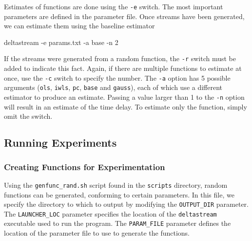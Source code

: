 \documentclass[a4paper,11pt]{article}
\begin{document}
\begin{appendices}
    Estimates of functions are done using the \texttt{-e} switch. The most
    important parameters are defined in the parameter file. Once streams have
    been generated, we can estimate them using the baseline estimator
    \begin{verbatimtab}
    deltastream -e params.txt -a base -n 2
    \end{verbatimtab}
    If the streams were generated from a random function, the \texttt{-r} switch
    must be added to indicate this fact. Again, if there are multiple functions
    to estimate at once, use the \texttt{-c} switch to specify the number. The
    \texttt{-a} option has 5 possible arguments (\texttt{ols}, \texttt{iwls},
    \texttt{pc}, \texttt{base} and \texttt{gauss}), each of which use a
    different estimator to produce an estimate. Passing a value larger than 1 to
    the \texttt{-n} option will result in an estimate of the time delay. To
    estimate only the function, simply omit the switch.
\subsection{Running Experiments}
\label{sec-10-3}
\subsubsection{Creating Functions for Experimentation}
\label{sec-10-3-1}

    Using the \texttt{genfunc\_rand.sh} script found in the \texttt{scripts} directory, random
    functions can be generated, conforming to certain parameters. In this file,
    we specify the directory to which to output by modifying the
    \texttt{OUTPUT\_DIR} parameter. The \texttt{LAUNCHER\_LOC} parameter specifies the
    location of the \texttt{deltastream} executable used to run the program. The
    \texttt{PARAM\_FILE} parameter defines the location of the parameter file to use
    to generate the functions.


\end{appendices}
\end{document}
